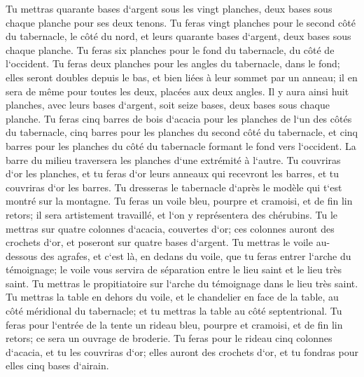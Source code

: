 \verse Tu mettras quarante bases d`argent sous les vingt planches, deux bases sous chaque planche pour ses deux tenons. 
\verse Tu feras vingt planches pour le second côté du tabernacle, le côté du nord, 
\verse et leurs quarante bases d`argent, deux bases sous chaque planche. 
\verse Tu feras six planches pour le fond du tabernacle, du côté de l`occident. 
\verse Tu feras deux planches pour les angles du tabernacle, dans le fond; 
\verse elles seront doubles depuis le bas, et bien liées à leur sommet par un anneau; il en sera de même pour toutes les deux, placées aux deux angles. 
\verse Il y aura ainsi huit planches, avec leurs bases d`argent, soit seize bases, deux bases sous chaque planche. 
\verse Tu feras cinq barres de bois d`acacia pour les planches de l`un des côtés du tabernacle, 
\verse cinq barres pour les planches du second côté du tabernacle, et cinq barres pour les planches du côté du tabernacle formant le fond vers l`occident. 
\verse La barre du milieu traversera les planches d`une extrémité à l`autre. 
\verse Tu couvriras d`or les planches, et tu feras d`or leurs anneaux qui recevront les barres, et tu couvriras d`or les barres. 
\verse Tu dresseras le tabernacle d`après le modèle qui t`est montré sur la montagne. 
\verse Tu feras un voile bleu, pourpre et cramoisi, et de fin lin retors; il sera artistement travaillé, et l`on y représentera des chérubins. 
\verse Tu le mettras sur quatre colonnes d`acacia, couvertes d`or; ces colonnes auront des crochets d`or, et poseront sur quatre bases d`argent. 
\verse Tu mettras le voile au-dessous des agrafes, et c`est là, en dedans du voile, que tu feras entrer l`arche du témoignage; le voile vous servira de séparation entre le lieu saint et le lieu très saint. 
\verse Tu mettras le propitiatoire sur l`arche du témoignage dans le lieu très saint. 
\verse Tu mettras la table en dehors du voile, et le chandelier en face de la table, au côté méridional du tabernacle; et tu mettras la table au côté septentrional. 
\verse Tu feras pour l`entrée de la tente un rideau bleu, pourpre et cramoisi, et de fin lin retors; ce sera un ouvrage de broderie. 
\verse Tu feras pour le rideau cinq colonnes d`acacia, et tu les couvriras d`or; elles auront des crochets d`or, et tu fondras pour elles cinq bases d`airain. 

